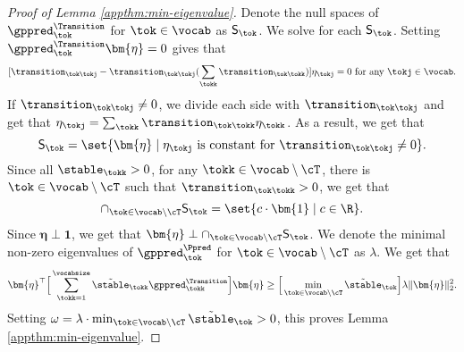 \begin{proof}[Proof of Lemma \ref{appthm:min-eigenvalue}]
Denote the null spaces of $\gppred_{\tok}^{\Transition}$ for $\tok \in \vocab$ as $\sf S_\tok$. We solve for each $\sf S_\tok$. Setting $\gppred_{\tok}^\Transition \bm{\eta}=0$ gives that 
\[
[\transition_{\tok\tokj} - \transition_{\tok\tokj}(\sum_{\tokk} \transition_{\tok\tokk})] \eta_\tokj = 0~\text{for any $\tokj\in\vocab$.}
\]
If $\transition_{\tok\tokj}\neq 0$, we divide each side with $\transition_{\tok\tokj}$ and get that $\eta_\tokj = \sum_{\tokk} \transition_{\tok\tokk} \eta_\tokk$. As a result, we get that 
\[
\text{\sf{S}}_\tok = \set{\bm{\eta}\mid \eta_\tokj\text{ is constant for } \transition_{\tok\tokj}\neq0}.
\]
Since all ${\stable}_\tokk > 0$, for any $\tokk\in\vocab\setminus \cT$, there is $\tok\in\vocab\setminus\cT$ such that $\transition_{\tok\tokk} > 0$, we get that
\[
\cap_{\tok\in\vocab\setminus\cT} \text{\sf{S}}_\tok = \set{c \cdot \bm{1}\mid c\in\R}.
\]
Since $\bm{\eta} \perp \bm{1}$, we get that $\bm{\eta} \perp \cap_{\tok\in\vocab\setminus\cT} \sf{S}_\tok$. We denote the minimal non-zero eigenvalues of $\gppred_{\tok}^\Ppred$ for $\tok\in\vocab\setminus\cT$ as $\lambda$. We get that
\[
\bm{\eta}^\top \Big[ \sum_{\tokk=1}^\vocabsize \Tilde{\stable}_\tokk\gppred_{\tokk}^{\Transition} \Big] \bm{\eta} \geq \Big[\min_{\tok \in \vocab\setminus \cT} \Tilde{\stable}_\tok\Big] \lambda \|\bm{\eta}\|_2^2.
\]
Setting $\omega = \lambda \cdot \min_{\tok \in \vocab\setminus \cT} \Tilde{\stable}_\tok>0$, this proves Lemma \ref{appthm:min-eigenvalue}.
\end{proof}

